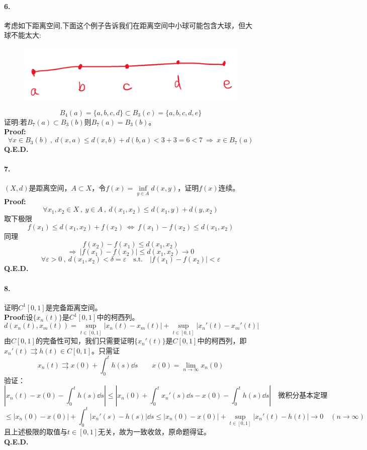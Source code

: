 \paragraph*{6.}考虑如下距离空间,下面这个例子告诉我们在距离空间中小球可能包含大球，但大球不能太大:
\begin{figure}[htbp]
    \center
    \includegraphics[scale=0.2]{./fig/ex-1.png}
\end{figure}
\[B_4(a)=\{a,b,c,d\} \subset B_3(c)=\{a,b,c,d,e\}\]
证明:若$B_7(a) \subset B_3(b)$则$B_7(a)=B_3(b)$。\\
\textbf{Proof:}
\[\forall x \in B_3(b) \ , \ d(x,a) \leq d(x,b)+d(b,a)<3+3=6<7 \ \Rightarrow \ x \in B_7(a)\]
\textbf{Q.E.D.}

\paragraph*{7.}$(X,d)$是距离空间，$A \subset X$，令$f(x)=\mathop \text{inf}\limits_{y \in A}d(x,y)$，证明$f(x)$连续。\\
\textbf{Proof:}
\[\forall x_1,x_2 \in X \ , \ y \in A \ , \ d(x_1,x_2) \leq d(x_1,y)+d(y,x_2)\]
取下极限
\[f(x_1) \leq d(x_1,x_2)+f(x_2) \ \Leftrightarrow \ f(x_1)-f(x_2) \leq d(x_1,x_2)\]
同理
\[f(x_2)-f(x_1) \leq d(x_1,x_2)\]
\[\Rightarrow \ |f(x_1)-f(x_2)| \leq d(x_1,x_2) \to 0\]
\[\forall \varepsilon>0 \ , \ d(x_1,x_2)<\delta=\varepsilon \quad \text{s.t.} \quad |f(x_1)-f(x_2)|<\varepsilon\]
\textbf{Q.E.D.}

\paragraph*{8.}证明$C^1[0,1]$是完备距离空间。\\
\textbf{Proof:}设$\{x_n(t)\}$是$C^1[0,1]$中的柯西列。
\[d(x_n(t),x_m(t))=\mathop \text{sup}\limits_{t \in [0,1]}|x_n(t)-x_m(t)|+\mathop \text{sup}\limits_{t \in [0,1]}|x_n'(t)-x_m'(t)|\]
由$C[0,1]$的完备性可知，我们只需要证明$\{x_n'(t)\}$是$C[0,1]$中的柯西列，即$x_n'(t) \rightrightarrows h(t) \in C[0,1]$。只需证
\[x_n(t) \rightrightarrows x(0)+\int_0^th(s)\dd s \qquad x(0)=\lim_{n \to \infty}x_n(0)\]
验证：
\[\left|x_n(t)-x(0)-\int_0^th(s)\dd s\right| \leq \left|x_n(0)+\int_0^tx_n'(s)\dd s-x(0)-\int_0^th(s)\dd s\right| \quad \text{微积分基本定理}\]
\[\leq \left|x_n(0)-x(0)\right|+\int_0^t|x_n'(s)-h(s)|\dd s \leq \left|x_n(0)-x(0)\right|+\mathop \text{sup}\limits_{t \in [0,1]}|x_n'(t)-h(t)| \to 0 \quad (n \to \infty)\]
且上述极限的取值与$t \in [0,1]$无关，故为一致收敛，原命题得证。\\
\textbf{Q.E.D.}


